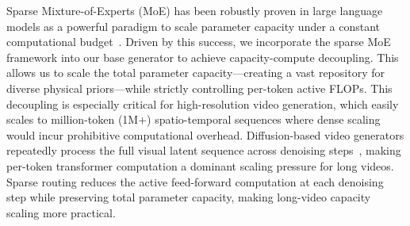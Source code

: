 Sparse Mixture-of-Experts (MoE) has been robustly proven in large language models as a powerful paradigm to scale parameter capacity under a constant computational budget~\cite{shazeer2017moe,lepikhin2020gshard,switchtransformer,dai2024deepseekmoe,deepseek2024v3}. Driven by this success, we incorporate the sparse MoE framework into our base generator to achieve capacity-compute decoupling. This allows us to scale the total parameter capacity---creating a vast repository for diverse physical priors---while strictly controlling per-token active FLOPs. This decoupling is especially critical for high-resolution video generation, which easily scales to million-token (1M+) spatio-temporal sequences where dense scaling would incur prohibitive computational overhead. Diffusion-based video generators repeatedly process the full visual latent sequence across denoising steps~\cite{ho2022video,peebles2023scalablediffusionmodelstransformers}, making per-token transformer computation a dominant scaling pressure for long videos. Sparse routing reduces the active feed-forward computation at each denoising step while preserving total parameter capacity, making long-video capacity scaling more practical.

